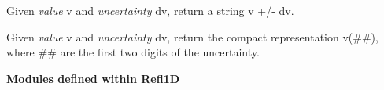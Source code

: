 \documentclass[letterpaper,10pt,english]{sphinxmanual}
\begin{document}
\begin{fulllineitems}
\label{api/mystic.formatnum:refl1d.mystic.formatnum.format_uncertainty_pm}
Given \emph{value} v and \emph{uncertainty} dv, return a string v +/- dv.

\end{fulllineitems}


\begin{fulllineitems}
\label{api/mystic.formatnum:refl1d.mystic.formatnum.format_uncertainty_compact}
Given \emph{value} v and \emph{uncertainty} dv, return the compact
representation v(\#\#), where \#\# are the first two digits of
the uncertainty.

\end{fulllineitems}


\textbf{Modules defined within Refl1D}
\end{document}
